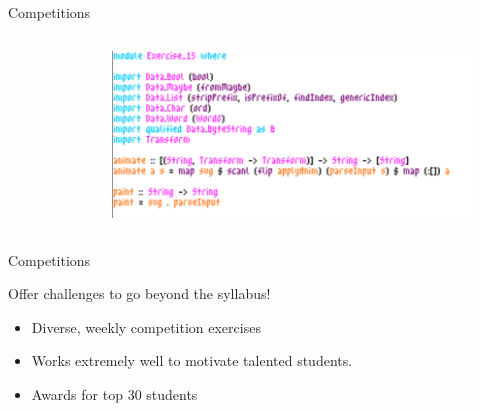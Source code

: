 \documentclass[aspectratio=169]{beamer}
\begin{document}
\begin{frame}[fragile]{Competitions}
{\begin{columns}[t]
\begin{column}{0.35\textwidth}
\begin{figure}
\end{figure}
\end{column}
\begin{column}{0.65\textwidth}
\begin{figure}
\includegraphics[width=\textwidth]{assets/creativity2}
\end{figure}
\end{column}
\end{columns}
}
\end{frame}

\begin{frame}[fragile]{Competitions}
\centerline{\Large{\alert{Offer challenges to go beyond the syllabus!}}}
\begin{itemize}
\item Diverse, weekly competition exercises
\item Works extremely well to motivate talented students.
\item<2-> Awards for top 30 students
\end{itemize}
\end{frame}
\end{document}
